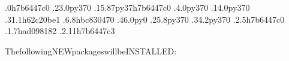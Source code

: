 \documentclass[a4paper,10pt,english]{sphinxmanual}
\begin{document}
\begin{sphinxVerbatim}[commandchars=\\\{\}]
\PYGZhy{}.0h7b6447c\PYGZus{}0
\PYGZhy{}.23.0py37\PYGZus{}0
\PYGZhy{}.15.87py37h7b6447c\PYGZus{}0
\PYGZhy{}.4.0py37\PYGZus{}0
\PYGZhy{}.14.0py37\PYGZus{}0
\PYGZhy{}.31.1h62c20be\PYGZus{}1
\PYGZhy{}.6.8hbc83047\PYGZus{}0
\PYGZhy{}.46.0py\PYGZus{}0
\PYGZhy{}.25.8py37\PYGZus{}0
\PYGZhy{}.34.2py37\PYGZus{}0
\PYGZhy{}.2.5h7b6447c\PYGZus{}0
\PYGZhy{}.1.7had09818\PYGZus{}2
\PYGZhy{}.2.11h7b6447c\PYGZus{}3


ThefollowingNEWpackageswillbeINSTALLED:


\end{sphinxVerbatim}
\end{document}
